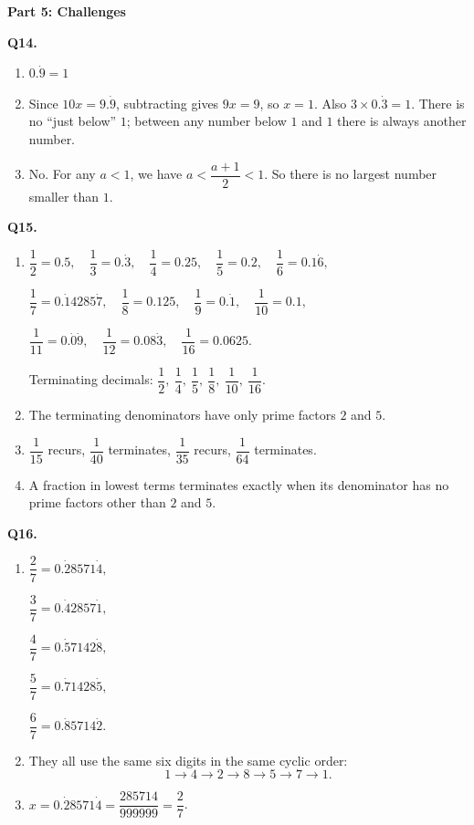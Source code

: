 \documentclass[12pt,a4paper]{article}
\begin{document}
\medskip
\noindent\textbf{\large Part 5: Challenges}

\medskip
\noindent\textbf{Q14.}
\begin{enumerate}[label=(\alph*),leftmargin=*]
\item $0.\dot{9}=1$
\item Since $10x=9.\dot{9}$, subtracting gives $9x=9$, so $x=1$. Also $3\times0.\dot{3}=1$. There is no “just below” $1$; between any number below $1$ and $1$ there is always another number.
\item No. For any $a<1$, we have $a<\dfrac{a+1}{2}<1$. So there is no largest number smaller than $1$.
\end{enumerate}

\medskip
\noindent\textbf{Q15.}
\begin{enumerate}[label=(\alph*),leftmargin=*]
\item
$\dfrac12=0.5,\quad
\dfrac13=0.\dot{3},\quad
\dfrac14=0.25,\quad
\dfrac15=0.2,\quad
\dfrac16=0.1\dot{6},$

$\dfrac17=0.\dot{1}4285\dot{7},\quad
\dfrac18=0.125,\quad
\dfrac19=0.\dot{1},\quad
\dfrac1{10}=0.1,$

$\dfrac1{11}=0.\dot{0}\dot{9},\quad
\dfrac1{12}=0.08\dot{3},\quad
\dfrac1{16}=0.0625.$

Terminating decimals:
$\dfrac12,\ \dfrac14,\ \dfrac15,\ \dfrac18,\ \dfrac1{10},\ \dfrac1{16}$.
\item The terminating denominators have only prime factors $2$ and $5$.
\item $\dfrac1{15}$ recurs, $\dfrac1{40}$ terminates, $\dfrac1{35}$ recurs, $\dfrac1{64}$ terminates.
\item A fraction in lowest terms terminates exactly when its denominator has no prime factors other than $2$ and $5$.
\end{enumerate}

\medskip
\noindent\textbf{Q16.}
\begin{enumerate}[label=(\alph*),leftmargin=*]
\item
$\dfrac27=0.\dot{2}8571\dot{4},$

$\dfrac37=0.\dot{4}2857\dot{1},$

$\dfrac47=0.\dot{5}7142\dot{8},$

$\dfrac57=0.\dot{7}1428\dot{5},$

$\dfrac67=0.\dot{8}5714\dot{2}.$
\item They all use the same six digits in the same cyclic order:
\[
1\to4\to2\to8\to5\to7\to1.
\]
\item $x=0.\dot{2}8571\dot{4}=\dfrac{285714}{999999}=\dfrac27$.
\end{enumerate}
\end{document}
